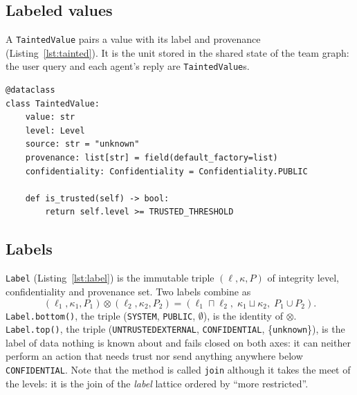 \documentclass[11pt,a4paper]{article}
\DeclareRobustCommand{\code}[1]{{\renewcommand{\_}{\textunderscore\allowbreak}\texttt{#1}}}
\begin{document}
\subsection{Labeled values}

A \code{TaintedValue} pairs a value with its label and provenance
(Listing~\ref{lst:tainted}). It is the unit stored in the shared state of the team graph:
the user query and each agent's reply are \code{TaintedValue}s.

\begin{lstlisting}[firstnumber=52,style=py,caption={Labeled value (\texttt{state.py}, lines 52--61)},label={lst:tainted}]
@dataclass
class TaintedValue:
    value: str
    level: Level
    source: str = "unknown"
    provenance: list[str] = field(default_factory=list)
    confidentiality: Confidentiality = Confidentiality.PUBLIC

    def is_trusted(self) -> bool:
        return self.level >= TRUSTED_THRESHOLD
\end{lstlisting}

\subsection{Labels}

\code{Label} (Listing~\ref{lst:label}) is the immutable triple
$(\ell, \kappa, P)$ of integrity level, confidentiality and provenance set. Two labels
combine as
\begin{equation}
  (\ell_1, \kappa_1, P_1) \otimes (\ell_2, \kappa_2, P_2)
  = (\ell_1 \sqcap \ell_2,\; \kappa_1 \sqcup \kappa_2,\; P_1 \cup P_2).
  \label{eq:combine}
\end{equation}
\code{Label.bottom()}, the triple (\code{SYSTEM}, \code{PUBLIC}, $\emptyset$), is the identity of
$\otimes$. \code{Label.top()}, the triple (\code{UNTRUSTED\_EXTERNAL}, \code{CONFIDENTIAL},
\{\code{unknown}\}), is the label of data nothing is known about and fails closed on both
axes: it can neither perform an action that needs trust nor send anything anywhere below
\code{CONFIDENTIAL}. Note that the method is called \code{join} although it takes the
meet of the levels: it is the join of the \emph{label} lattice ordered by ``more
restricted''.
\end{document}
